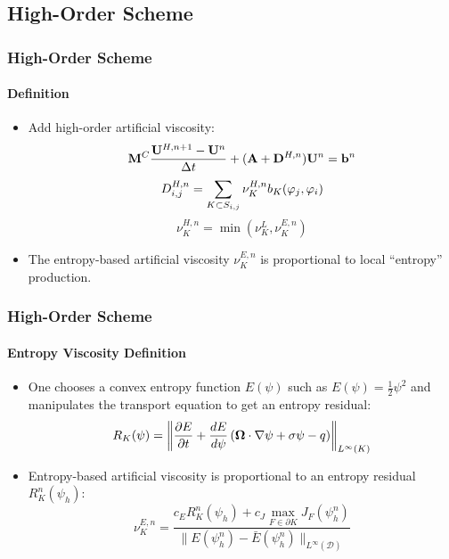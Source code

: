 \documentclass{beamer}
\begin{document}
\subsection{High-Order Scheme}
\begin{frame}
\frametitle{High-Order Scheme}
\framesubtitle{Definition}

\begin{itemize}
   \item Add high-order artificial viscosity:
   \begin{equation}
      \mathbf{M}^C\frac{\mathbf{U}^{H,n+1}-\mathbf{U}^n}{\Delta t} + (\mathbf{A} + \mathbf{D}^{H,n})\mathbf{U}^n = \mathbf{b}^n
   \end{equation}
   \begin{equation}
      D_{i,j}^{H,n} = \sum\limits_{K\subset S_{i,j}}\nu_K^{H,n} b_K(\varphi_j,\varphi_i)
   \end{equation}
   \begin{equation}
      \nu^{H,n}_K = \min(\nu^{L}_K,\nu^{E,n}_K)
   \end{equation}
   \item The entropy-based artificial viscosity $\nu^{E,n}_K$ is
   proportional to local ``entropy'' production.
\end{itemize}

\end{frame}
\begin{frame}
\frametitle{High-Order Scheme}
\framesubtitle{Entropy Viscosity Definition}

\begin{itemize}
   \item One chooses a convex entropy function $E(\psi)$ such
   as $E(\psi)=\frac{1}{2}\psi^2$ and manipulates the
   transport equation to get an entropy residual:
   \begin{equation}
      R_K(\psi) = \left\|\frac{\partial E}{\partial t}
      + \frac{dE}{d\psi}\left(\mathbf{\Omega}\cdot\nabla \psi
      + \sigma \psi
      - q \right)\right\|_{L^\infty(K)}
   \end{equation}
   \item Entropy-based artificial viscosity is proportional to an entropy
   residual $R_K^n(\psi_h)$:
   \begin{equation}
      \nu^{E,n}_K = \frac{c_E R_K^n(\psi_h)
      + c_J\max\limits_{F\in\partial K}J_F(\psi_h^n)}
      {\|E(\psi_h^n)-\bar{E}(\psi_h^n)\|_{L^\infty(\mathcal{D})}}
   \end{equation}
\end{itemize}
   
\end{frame}
\end{document}
